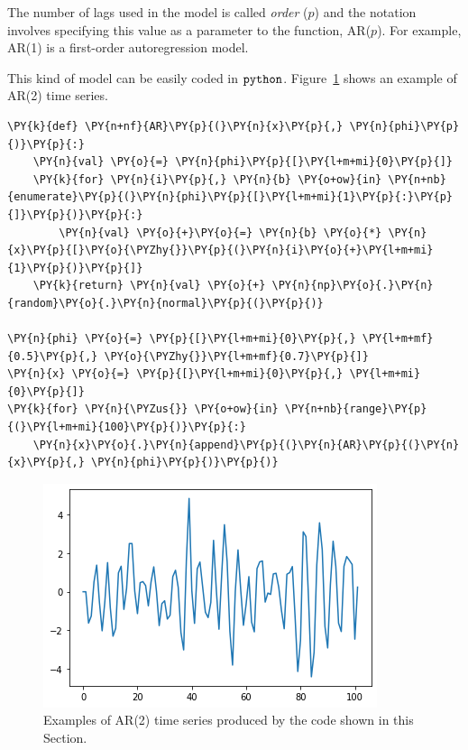 The number of lags used in the model is called \emph{order} (\(p\)) 
and the  notation involves specifying this value as 
a parameter to the function, AR(\(p\)). For example,
AR(1) is a first-order autoregression model.

This kind of model can be easily coded in \(\tt{python}\). Figure~\ref{fig:ar2_example} shows an example of AR(2) time series.

\begin{tcolorbox}[breakable, size=fbox, boxrule=1pt, pad at break*=1mm,colback=cellbackground, colframe=cellborder]
\begin{Verbatim}[commandchars=\\\{\}]
\PY{k}{def} \PY{n+nf}{AR}\PY{p}{(}\PY{n}{x}\PY{p}{,} \PY{n}{phi}\PY{p}{)}\PY{p}{:}
    \PY{n}{val} \PY{o}{=} \PY{n}{phi}\PY{p}{[}\PY{l+m+mi}{0}\PY{p}{]}
    \PY{k}{for} \PY{n}{i}\PY{p}{,} \PY{n}{b} \PY{o+ow}{in} \PY{n+nb}{enumerate}\PY{p}{(}\PY{n}{phi}\PY{p}{[}\PY{l+m+mi}{1}\PY{p}{:}\PY{p}{]}\PY{p}{)}\PY{p}{:}
        \PY{n}{val} \PY{o}{+}\PY{o}{=} \PY{n}{b} \PY{o}{*} \PY{n}{x}\PY{p}{[}\PY{o}{\PYZhy{}}\PY{p}{(}\PY{n}{i}\PY{o}{+}\PY{l+m+mi}{1}\PY{p}{)}\PY{p}{]}
    \PY{k}{return} \PY{n}{val} \PY{o}{+} \PY{n}{np}\PY{o}{.}\PY{n}{random}\PY{o}{.}\PY{n}{normal}\PY{p}{(}\PY{p}{)}

\PY{n}{phi} \PY{o}{=} \PY{p}{[}\PY{l+m+mi}{0}\PY{p}{,} \PY{l+m+mf}{0.5}\PY{p}{,} \PY{o}{\PYZhy{}}\PY{l+m+mf}{0.7}\PY{p}{]}
\PY{n}{x} \PY{o}{=} \PY{p}{[}\PY{l+m+mi}{0}\PY{p}{,} \PY{l+m+mi}{0}\PY{p}{]}
\PY{k}{for} \PY{n}{\PYZus{}} \PY{o+ow}{in} \PY{n+nb}{range}\PY{p}{(}\PY{l+m+mi}{100}\PY{p}{)}\PY{p}{:}
    \PY{n}{x}\PY{o}{.}\PY{n}{append}\PY{p}{(}\PY{n}{AR}\PY{p}{(}\PY{n}{x}\PY{p}{,} \PY{n}{phi}\PY{p}{)}\PY{p}{)}
\end{Verbatim}
\end{tcolorbox}

\begin{figure}[htb]
	\centering
	\includegraphics[width=0.7\linewidth]{figures/ar2.png}
	\caption{Examples of AR(2) time series produced by the code shown in this Section.}
	\label{fig:ar2_example}
\end{figure}
   
